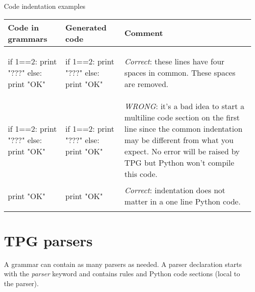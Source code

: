 \begin{tableau}
\caption{Code indentation examples}							\label{grammar:indent}
\begin{tabular}{| p{5cm} | p{4cm} | p{4cm} |}
\hline
	Code in grammars & Generated code & Comment \\
\hline
\hline

	\begin{verbatim*}
{{
    if 1==2:
        print "???"
    else:
        print "OK"
}}
	\end{verbatim*}
	&
	\begin{verbatim*}

if 1==2:
    print "???"
else:
    print "OK"
	\end{verbatim*}
	&
	\emph{Correct}: these lines have four spaces in common.  These spaces are removed.
	\\

\hline

	\begin{verbatim*}
{{  if 1==2:
        print "???"
    else:
        print "OK"
}}
	\end{verbatim*}
	&
	\begin{verbatim*}
if 1==2:
      print "???"
  else:
      print "OK"
	\end{verbatim*}
	&
	\emph{WRONG}: it's a bad idea to start a multiline code section on the first line since the common indentation may be different from what you expect.  No error will be raised by TPG but Python won't compile this code.
	\\

\hline

	\begin{verbatim*}
{{       print "OK" }}
	\end{verbatim*}
	&
	\begin{verbatim*}
print "OK"
	\end{verbatim*}
	&
	\emph{Correct}: indentation does not matter in a one line Python code.
	\\

\hline

\end{tabular}
\end{tableau}

\section{TPG parsers}										\label{grammar:parser}

A grammar can contain as many parsers as needed.
A parser declaration starts with the \emph{parser} keyword and contains rules and Python code sections (local to the parser).

